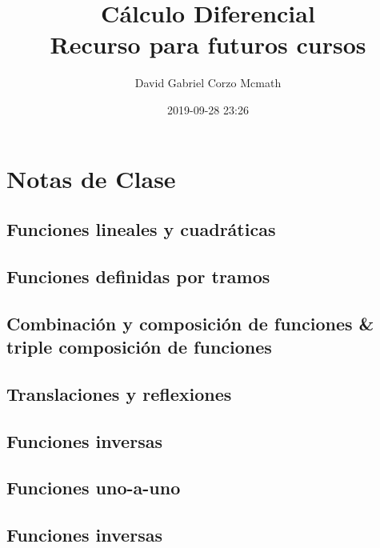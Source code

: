 \documentclass{book}
\author{David Gabriel Corzo Mcmath}
\title{\Huge Cálculo Diferencial \normalsize \\ Recurso para futuros cursos}
\date{2019-09-28 23:26}
\begin{document}
\maketitle
\tableofcontents

\part{Notas de Clase}

\chapter{Funciones lineales y cuadráticas}


\chapter{Funciones definidas por tramos}


\chapter{Combinación y composición de funciones \& triple composición de funciones}


\chapter{Translaciones y reflexiones}


\chapter{Funciones inversas}


\chapter{Funciones uno-a-uno}


\chapter{Funciones inversas}

\end{document}
